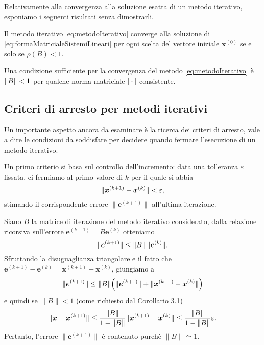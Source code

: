 Relativamente alla convergenza alla soluzione esatta di un metodo iterativo, esponiamo i seguenti risultati senza dimostrarli.
\begin{teorema}
    Il metodo iterativo \eqref{eq:metodoIterativo} converge alla soluzione di \eqref{eq:formaMatricialeSistemiLineari} per ogni scelta del vettore iniziale 
    $\bm{x}^{(0)}$ se e solo se $\rho(B)<1$.
\end{teorema}
\begin{corollario}
    \label{cor:condizioneSufficienteConvergenza}
Una condizione sufficiente per la convergenza del metodo \eqref{eq:metodoIterativo} \`e $\lVert B\rVert<1$ per qualche norma matriciale $\lVert\cdot\rVert$ consistente.
\end{corollario}

\subsection{Criteri di arresto per metodi iterativi}
\label{sec:criteriArresto}
Un importante aspetto ancora da esaminare \`e la ricerca dei criteri di arresto, vale a dire le condizioni da soddisfare per decidere quando fermare l'esecuzione di un 
metodo iterativo.

Un primo criterio si basa sul controllo dell'incremento: data una tolleranza $\varepsilon$ fissata, ci fermiamo al primo valore di $k$ per il quale si abbia
\begin{equation*}
    \lVert\bm{x}^{(k+1)} - \bm{x}^{(k)}\rVert<\varepsilon,
\end{equation*}
stimando il corrispondente errore $\|\bm{e}^{(k+1)}\|$ all'ultima iterazione.

Siano $B$ la matrice di iterazione del metodo iterativo considerato, dalla relazione ricorsiva sull'errore $\bm{e}^{(k+1)}= B\bm{e}^{(k)}$ otteniamo
\begin{equation}
    \lVert\bm{e}^{(k+1)}\rVert \le \lVert B\rVert\,\lVert\bm{e}^{(k)}\rVert.
\end{equation}
Sfruttando la disuguaglianza triangolare e il fatto che $\bm{e}^{(k+1)} - \bm{e}^{(k)} = \bm{x}^{(k+1)} - \bm{x}^{(k)}$, giungiamo a
\begin{equation*}
    \lVert\bm{e}^{(k+1)}\rVert \le \lVert B\rVert\Big(\lVert\bm{e}^{(k+1)}\rVert + \lVert\bm{x}^{(k+1)} - \bm{x}^{(k)}\rVert\Big)
\end{equation*}
e quindi se $\|B\|<1$ (come richiesto dal Corollario 3.1)
\begin{equation}
    \lVert\bm{x} - \bm{x}^{(k+1)}\rVert\le \frac{\lVert B\rVert}{1 - \lVert B\rVert}\lVert\bm{x}^{(k+1)} - \bm{x}^{(k)}\rVert \le  \frac{\lVert B\rVert}{1 - \lVert B\rVert} \varepsilon.
\end{equation}
Pertanto, l'errore  $\|\bm{e}^{(k+1)}\|$ \`e contenuto purch\`e $\|B\|\simeq 1$.

